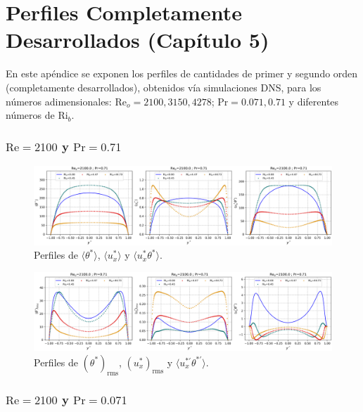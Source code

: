 \chapter{Perfiles Completamente Desarrollados (Capítulo 5)} \label{apen:desarrollado}

En este apéndice se exponen los perfiles de cantidades de primer y segundo orden (completamente desarrollados), obtenidos vía simulaciones DNS, para los números adimensionales: $\text{Re}_o=2100,3150,4278$; $\text{Pr}=0\text{.}071,0\text{.}71$ y diferentes números de Ri$_b$. 

\subsection*{$\text{Re}=2100$ y $\text{Pr}=0\text{.}71$}

\begin{figure}[H]
  \centering
    \includegraphics[width=\textwidth]{figures/apendices/developed/Re2100-Pr071_merged_phi-ux-uxphi.png}
  \caption{Perfiles de  $\langle \theta^* \rangle$,  $\langle u^*_x \rangle$ y   $\langle u^*_x \theta^* \rangle$.}
  \label{fig:profs-Re2100-Pr071}
\end{figure}

\begin{figure}[H]
  \centering
    \includegraphics[width=\textwidth]{figures/apendices/developed/Re2100-Pr071_merged_phif-uxf-uxphif.png}
  \caption{Perfiles de  $( \theta^*)_{\text{rms}}$,  $(u^*_x)_{\text{rms}}$ y  $\langle u^{* \prime}_x \theta^{* \prime} \rangle$.}
  \label{fig:profs-Re2100-Pr071}
\end{figure}

\subsection*{$\text{Re}=2100$ y $\text{Pr}=0\text{.}071$}

